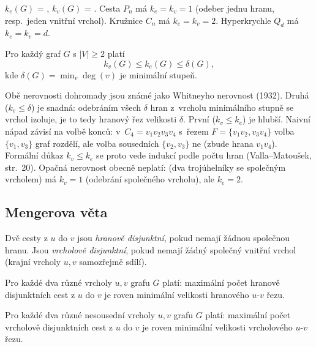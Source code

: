 \documentclass[11pt,a4paper]{article}
\begin{document}
\begin{intuice}
$k_e(G)$ = , $k_v(G)$ = . Cesta $P_n$ má $k_e=k_v=1$ (odeber jednu hranu, resp.\ jeden vnitřní vrchol). Kružnice $C_n$ má $k_e=k_v=2$. Hyperkrychle $Q_d$ má $k_e=k_v=d$.
\end{intuice}

\begin{veta}
Pro každý graf $G$ s $|V|\ge 2$ platí
\[ k_v(G)\le k_e(G)\le\delta(G), \]
kde $\delta(G)=\min_v\deg(v)$ je minimální stupeň.
\end{veta}

\begin{intuice}
Obě nerovnosti dohromady jsou známé jako Whitneyho nerovnost (1932). Druhá ($k_e\le\delta$) je snadná: odebráním všech $\delta$ hran z~vrcholu minimálního stupně se vrchol izoluje, je to tedy hranový řez velikosti $\delta$. První ($k_v\le k_e$) je hlubší. Naivní nápad  závisí na volbě konců: v~$C_4=v_1v_2v_3v_4$ s~řezem $F=\{v_1v_2,v_3v_4\}$ volba $\{v_1,v_3\}$ graf rozdělí, ale volba sousedních $\{v_2,v_3\}$ ne (zbude hrana $v_1v_4$). Formální důkaz $k_v\le k_e$ se proto vede indukcí podle počtu hran (Valla--Matoušek, str.~20). Opačná nerovnost obecně neplatí:  (dva trojúhelníky se společným vrcholem) má $k_v=1$ (odebrání společného vrcholu), ale $k_e=2$.
\end{intuice}

\subsection{Mengerova věta}

\begin{definice}
Dvě cesty z $u$ do $v$ jsou \emph{hranově disjunktní}, pokud nemají žádnou společnou hranu. Jsou \emph{vrcholově disjunktní}, pokud nemají žádný společný vnitřní vrchol (krajní vrcholy $u,v$ samozřejmě sdílí).
\end{definice}

\begin{veta}
Pro každé dva různé vrcholy $u,v$ grafu $G$ platí: maximální počet hranově disjunktních cest z $u$ do $v$ je roven minimální velikosti hranového $u$-$v$ řezu.
\end{veta}

\begin{veta}
Pro každé dva různé nesousední vrcholy $u,v$ grafu $G$ platí: maximální počet vrcholově disjunktních cest z $u$ do $v$ je roven minimální velikosti vrcholového $u$-$v$ řezu.
\end{veta}
\end{document}
